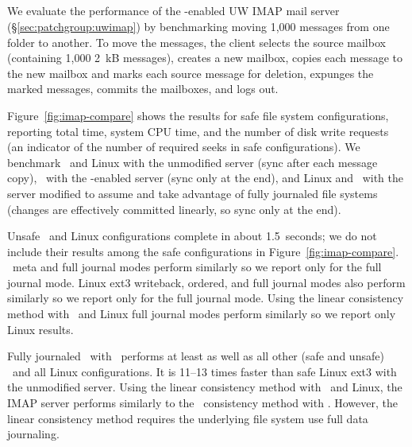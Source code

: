 \subsection {\Patchgroups}
\label{sec:evaluation:uwimap}


We evaluate the performance of the \patchgroup-enabled UW IMAP mail
server (\S\ref{sec:patchgroup:uwimap}) by benchmarking moving 1,000
messages from one folder to another.
%
To move the messages, the client selects the source mailbox (containing
1,000 2~kB messages), creates a new mailbox, copies each message to
the new mailbox and marks each source message for deletion, expunges
the marked messages, commits the mailboxes, and logs out.

Figure~\ref{fig:imap-compare} shows the results for safe file system
configurations,
%
reporting total time, system CPU time, and the number of disk write
requests (an indicator of the number of required seeks in safe
configurations).
%
We benchmark
%
\Kudos\ and Linux with the unmodified server (sync after each message
copy),
%
\Kudos\ with the \patchgroup-enabled server (sync only at the end),
%
and Linux and \Kudos\ with the server modified to assume and take
advantage of fully journaled file systems (changes are effectively
committed linearly, so sync only at the end).

Unsafe \Kudos\ and Linux configurations complete in about 1.5~seconds;
we do not include their results among the safe configurations in
Figure~\ref{fig:imap-compare}.
%
\Kudos\ meta and full journal modes perform similarly so we report
only for the full journal mode.
%
Linux ext3 writeback, ordered, and full journal modes also perform similarly
so we report only for the full journal mode.
%
Using the linear consistency method with \Kudos\ and Linux full
journal modes perform similarly so we report only Linux results.

Fully journaled \Kudos\ with \patchgroups\ performs at least as well
as all other (safe and unsafe) \Kudos\ and all Linux configurations.
It is 11--13 times faster than safe Linux ext3 with the unmodified
server.
%
Using the linear consistency method with \Kudos\ and Linux, the IMAP
server performs similarly to the \patchgroup\ consistency method with
\Kudos. However, the linear consistency method requires the underlying
file system use full data journaling.

